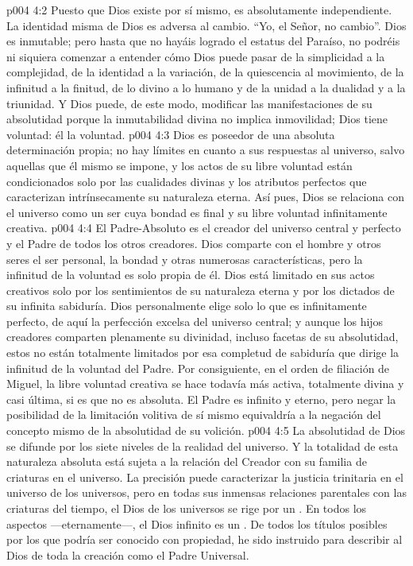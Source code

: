 \vs p004 4:2 Puesto que Dios existe por sí mismo, es absolutamente independiente. La identidad misma de Dios es adversa al cambio. “Yo, el Señor, no cambio”. Dios es inmutable; pero hasta que no hayáis logrado el estatus del Paraíso, no podréis ni siquiera comenzar a entender cómo Dios puede pasar de la simplicidad a la complejidad, de la identidad a la variación, de la quiescencia al movimiento, de la infinitud a la finitud, de lo divino a lo humano y de la unidad a la dualidad y a la triunidad. Y Dios puede, de este modo, modificar las manifestaciones de su absolutidad porque la inmutabilidad divina no implica inmovilidad; Dios tiene voluntad: él  la voluntad.
\vs p004 4:3 Dios es poseedor de una absoluta determinación propia; no hay límites en cuanto a sus respuestas al universo, salvo aquellas que él mismo se impone, y los actos de su libre voluntad están condicionados solo por las cualidades divinas y los atributos perfectos que caracterizan intrínsecamente su naturaleza eterna. Así pues, Dios se relaciona con el universo como un ser cuya bondad es final y su libre voluntad infinitamente creativa.
\vs p004 4:4 El Padre\hyp{}Absoluto es el creador del universo central y perfecto y el Padre de todos los otros creadores. Dios comparte con el hombre y otros seres el ser personal, la bondad y otras numerosas características, pero la infinitud de la voluntad es solo propia de él. Dios está limitado en sus actos creativos solo por los sentimientos de su naturaleza eterna y por los dictados de su infinita sabiduría. Dios personalmente elige solo lo que es infinitamente perfecto, de aquí la perfección excelsa del universo central; y aunque los hijos creadores comparten plenamente su divinidad, incluso facetas de su absolutidad, estos no están totalmente limitados por esa completud de sabiduría que dirige la infinitud de la voluntad del Padre. Por consiguiente, en el orden de filiación de Miguel, la libre voluntad creativa se hace todavía más activa, totalmente divina y casi última, si es que no es absoluta. El Padre es infinito y eterno, pero negar la posibilidad de la limitación volitiva de sí mismo equivaldría a la negación del concepto mismo de la absolutidad de su volición.
\vs p004 4:5 \pc La absolutidad de Dios se difunde por los siete niveles de la realidad del universo. Y la totalidad de esta naturaleza absoluta está sujeta a la relación del Creador con su familia de criaturas en el universo. La precisión puede caracterizar la justicia trinitaria en el universo de los universos, pero en todas sus inmensas relaciones parentales con las criaturas del tiempo, el Dios de los universos se rige por un . En todos los aspectos ---eternamente---, el Dios infinito es un . De todos los títulos posibles por los que podría ser conocido con propiedad, he sido instruido para describir al Dios de toda la creación como el Padre Universal.
